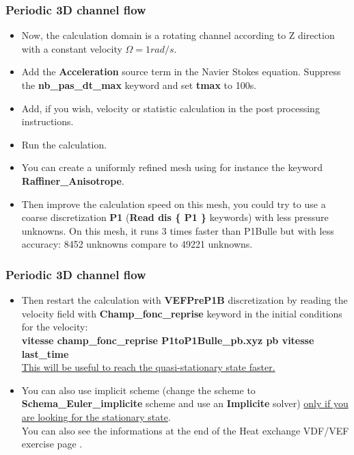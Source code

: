\documentclass[10pt]{beamer}
\begin{document}
\begin{frame}
\frametitle{Periodic 3D channel flow}
\begin{block}{}

\begin{itemize}
\item Now, the calculation domain is a rotating channel according to Z direction with a constant velocity $\Omega=1 rad/s$. 

\item Add the \textbf{Acceleration} source term in the Navier Stokes equation. Suppress the \textbf{nb\_pas\_dt\_max} keyword and set \textbf{tmax} to 100s.

\item Add, if you wish, velocity or statistic calculation in the post processing instructions. 

\item Run the calculation.

\item You can create a uniformly refined mesh using for instance the keyword \textbf{Raffiner\_Anisotrope}.

\item Then improve the calculation speed on this mesh, you could try to use a coarse discretization \textbf{P1} (\textbf{Read dis \{ P1 \}} keywords) with less pressure unknowns. On this mesh, it runs 3 times faster than P1Bulle but with less accuracy: 8452 unknowns compare to 49221 unknowns.
\end{itemize}

\end{block}
\end{frame}
\begin{frame}
\frametitle{Periodic 3D channel flow}
\begin{block}{}

\begin{itemize}
\item Then restart the calculation with \textbf{VEFPreP1B} discretization by reading the velocity field with \textbf{Champ\_fonc\_reprise} keyword in the initial conditions for the velocity:\\
\textbf{vitesse champ\_fonc\_reprise P1toP1Bulle\_pb.xyz  pb  vitesse  last\_time} \\
\underline{This will be useful to reach the quasi-stationary state faster.}

\item You can also use implicit scheme (change the scheme to \textbf{Schema\_Euler\_implicite} scheme and use an \textbf{Implicite} solver) \underline{only if you are looking for the stationary state}.\\ 
You can also see the informations at the end of the Heat exchange VDF/VEF exercise page \pageref{schema_impl}.
\end{itemize}

\end{block}
\end{frame}
\end{document}
